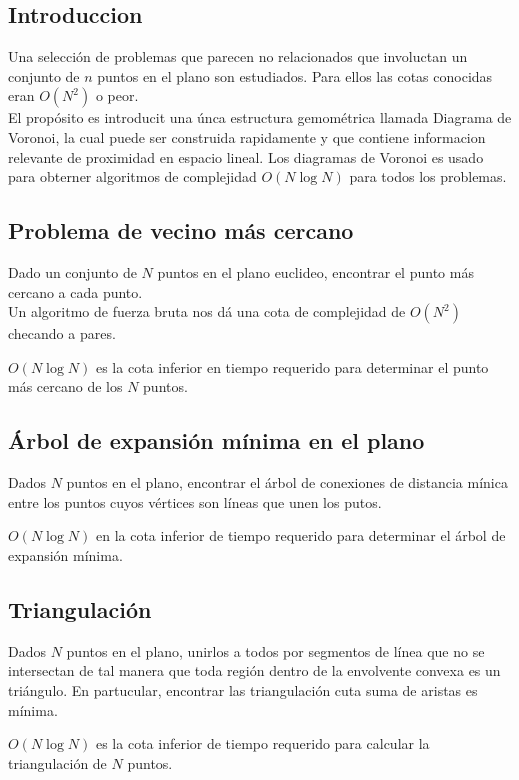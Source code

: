 \subsection{Introduccion}
Una selección de problemas que parecen no relacionados que involuctan un conjunto de $n$ puntos en el plano son estudiados. Para ellos las cotas conocidas eran $O(N^2)$ o peor. \\
El propósito es introducit una únca estructura gemométrica llamada Diagrama de Voronoi, la cual puede ser construida rapidamente y que contiene informacion relevante de proximidad en espacio lineal. Los diagramas de Voronoi es usado para obterner algoritmos de complejidad $O(N \log N)$ para todos los problemas.
\subsection{Problema de vecino más cercano}
Dado un conjunto de $N$ puntos en el plano euclideo, encontrar el punto más cercano a cada punto. \\
Un algoritmo de fuerza bruta nos dá una cota de complejidad de $O(N^2)$ checando a pares.

\begin{theorem}
$O(N \log N)$ es la cota inferior en tiempo requerido para determinar el punto más cercano de los $N$ puntos.
\end{theorem}

\subsection{Árbol de expansión mínima en el plano}
Dados $N$ puntos en el plano, encontrar el árbol de conexiones de distancia mínica entre los puntos cuyos vértices son líneas que unen los putos.

\begin{theorem}
$O(N \log N)$ en la cota inferior de tiempo requerido para determinar el árbol de expansión mínima.
\end{theorem}

\subsection{Triangulación}
Dados $N$ puntos en el plano, unirlos a todos por segmentos de línea que no se intersectan de tal manera que toda región dentro de la envolvente convexa es un triángulo. En partucular, encontrar las triangulación cuta suma de aristas es mínima.

\begin{theorem}
$O(N \log N)$ es la cota inferior de tiempo requerido para calcular la triangulación de $N$ puntos.
\end{theorem}

